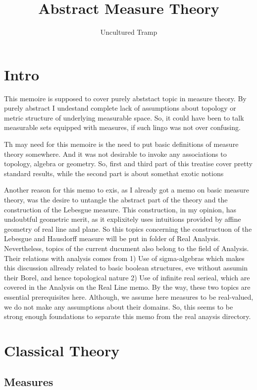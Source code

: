\documentclass[12pt]{scrartcl}
\author{Uncultured Tramp}
\title{Abstract Measure Theory}
\renewcommand{\.}{\; . \;}
\begin{document}
\maketitle
\thispagestyle{empty}
\newpage
\thispagestyle{empty}
\tableofcontents
\newpage
\thispagestyle{empty}
\section*{Intro}
This memoire is supposed to cover purely abststact topic in measure theory.
By purely abstract I undestand complete lack of assumptions about topology
or metric structure of underlying measurable space. So, it could have been 
to talk measurable sets equipped with measures, if such lingo was not 
over confusing.

Th may need for this memoire is the need to put basic definitions of 
measure theory somewhere. And it was not desirable to invoke
any associations to topology, algebra or geometry. 
So, first and third part of this treatise cover pretty standard results,
while the second part is about somethat exotic notions 

Another reason for this memo to exis, as I already got a memo
on basic measure theory, was the desire to untangle the
abstract part of the theory and the construction of the 
Lebesgue measure. This construction, in my opinion,
has undoubtful geometric merit, as it explixitely uses
intuitions provided by affine geometry of real line and plane.
So this topics concerning the constructuon of the Lebesgue
and Hausdorff measure will be put in folder of Real Analysis.
Nevertheless,  topics  of the current ducument also belong to the field of Analysis.
Their relations with analysis comes from 
1) Use of sigma-algebras which makes this discussion allready related to basic boolean structures,
eve without assumin their Borel, and hence topological nature
2) Use of infinite real serieal, which are covered in the Analysis on the Real Line memo.
By the way, these two topics are essential prerequisites here.  
Although, we assume here measures to be real-valued, we do not make any assumptions about their domains. So, this seems to be strong enough foundations to separate this memo from the real anaysis directory.
\newpage
{}
\section{Classical Theory}
\subsection{Measures}
\end{document}
